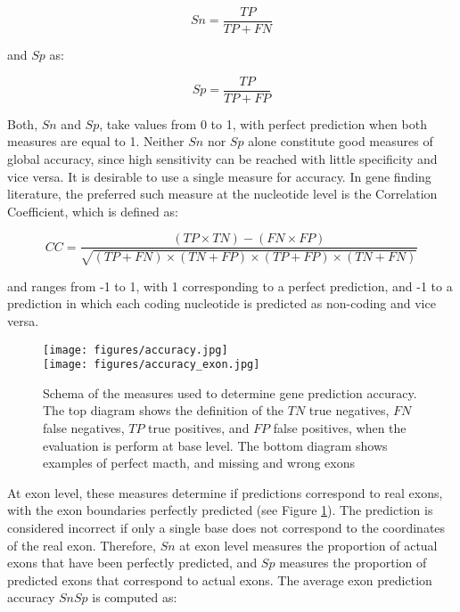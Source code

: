 \begin{equation}
Sn= \frac{TP}{TP+FN}
\end{equation}

\noindent and $Sp$ as: 

\begin{equation}
Sp=\frac{TP}{TP+FP}
\end{equation}

Both, $Sn$ and $Sp$, take values from 0 to 1, with perfect prediction
when both measures are equal to 1. Neither $Sn$ nor $Sp$ alone
constitute good measures of global accuracy, since high sensitivity
can be reached with little specificity and vice versa. It is desirable
to use a single measure for accuracy. In gene finding literature,
the preferred such measure at the nucleotide level is the Correlation
Coefficient, which is defined as:

\begin{equation}
CC = \frac{(TP \times TN) - (FN \times FP)}
  {\sqrt{(TP + FN) \times (TN + FP) \times (TP + FP) \times (TN + FN)}}
\end{equation}


\noindent and ranges from -1 to 1, with 1 corresponding to a perfect 
prediction, and -1 to a prediction in which each coding nucleotide is
predicted as non-coding and vice versa.

\begin{figure}
\begin{center}
\texttt{[image: figures/accuracy.jpg]}\\
\texttt{[image: figures/accuracy\_exon.jpg]}
\caption{Schema of the measures used to determine gene prediction accuracy. 
The top diagram shows the definition of the $TN$ true negatives, $FN$
false negatives, $TP$ true positives, and $FP$ false positives, when
the evaluation is perform at base level. The bottom diagram shows
examples of perfect macth, and missing and wrong exons}
\label{accuracy schema}
\end{center}
\end{figure}

At exon level, these measures determine if predictions correspond to
real exons, with the exon boundaries perfectly predicted (see Figure
\ref{accuracy schema}). The prediction is considered incorrect if 
only a single base does not correspond to the coordinates of the real
exon. Therefore, $Sn$ at exon level measures the proportion of actual
exons that have been perfectly predicted, and $Sp$ measures the
proportion of predicted exons that correspond to actual exons. The
average exon prediction accuracy $SnSp$ is computed as:


